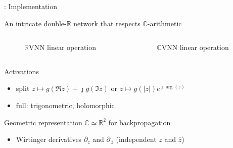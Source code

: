 \documentclass{beamer}
\newcommand{\real}{\mathbb{R}}
\newcommand{\cplx}{\mathbb{C}}
\newcommand{\conj}[1]{\overline{#1}}
\newcommand{\iu}{{\jmath}}
\begin{document}
\begin{frame}[c]{\insertsection: Implementation}

  An intricate double-$\real$ network that respects $\cplx$-arithmetic
  \vspace{-1em}
  \begin{columns}[T]
    \begin{column}{0.45\linewidth}
      \begin{figure}
          
        {$\real$VNN linear operation}
      \end{figure}
    \end{column}%
    \begin{column}{0.45\linewidth}
      \begin{figure}
          
        {$\cplx$VNN linear operation}
      \end{figure}
    \end{column}
  \end{columns}

  \bigskip

  \pause
  \bigskip
  Activations
  \begin{itemize}
    \item split $
      z \mapsto g(\Re{z}) + \iu g(\Im{z}) %
    $ or $
      z \mapsto g(\lvert z\rvert) e^{\iu \arg{\!(z)}}
    $ %

    \item full: trigonometric, holomorphic
  \end{itemize}

  \bigskip

  \pause
  \bigskip
  Geometric representation $\cplx \simeq \real^2$ for backpropagation
  \begin{itemize}
    \item Wirtinger derivatives $
        \partial_z
      $ and $
        \partial_{\,\conj{z}}
      $ (independent $z$ and ${\conj{z}}$)


\end{itemize}
\end{frame}
\end{document}

